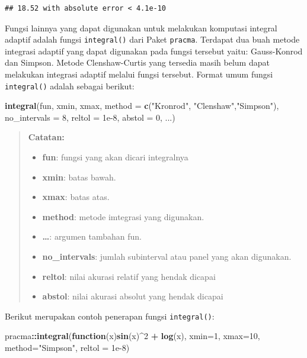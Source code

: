 \documentclass[]{book}
\newenvironment{Shaded}{\begin{snugshade}}{\end{snugshade}}
\newcommand{\ControlFlowTok}[1]{\textcolor[rgb]{0.13,0.29,0.53}{\textbf{#1}}}
\newcommand{\DataTypeTok}[1]{\textcolor[rgb]{0.13,0.29,0.53}{#1}}
\newcommand{\DecValTok}[1]{\textcolor[rgb]{0.00,0.00,0.81}{#1}}
\newcommand{\FloatTok}[1]{\textcolor[rgb]{0.00,0.00,0.81}{#1}}
\newcommand{\KeywordTok}[1]{\textcolor[rgb]{0.13,0.29,0.53}{\textbf{#1}}}
\newcommand{\NormalTok}[1]{#1}
\newcommand{\OperatorTok}[1]{\textcolor[rgb]{0.81,0.36,0.00}{\textbf{#1}}}
\newcommand{\StringTok}[1]{\textcolor[rgb]{0.31,0.60,0.02}{#1}}
\providecommand{\tightlist}{%
  \setlength{\itemsep}{0pt}\setlength{\parskip}{0pt}}
\theoremstyle{definition}
\theoremstyle{definition}
\theoremstyle{definition}
\theoremstyle{remark}
\begin{document}
\begin{verbatim}
## 18.52 with absolute error < 4.1e-10
\end{verbatim}

Fungsi lainnya yang dapat digunakan untuk melakukan komputasi integral adaptif adalah fungsi \texttt{integral()} dari Paket \texttt{pracma}. Terdapat dua buah metode integrasi adaptif yang dapat digunakan pada fungsi tersebut yaitu: Gauss-Konrod dan Simpson. Metode Clenshaw-Curtis yang tersedia masih belum dapat melakukan integrasi adaptif melalui fungsi tersebut. Format umum fungsi \texttt{integral()} adalah sebagai berikut:

\begin{Shaded}
\begin{Highlighting}[]
\KeywordTok{integral}\NormalTok{(fun, xmin, xmax,}
         \DataTypeTok{method =} \KeywordTok{c}\NormalTok{(}\StringTok{"Kronrod"}\NormalTok{, }\StringTok{"Clenshaw"}\NormalTok{,}\StringTok{"Simpson"}\NormalTok{),}
         \DataTypeTok{no_intervals =} \DecValTok{8}\NormalTok{, }\DataTypeTok{reltol =} \FloatTok{1e-8}\NormalTok{, }
         \DataTypeTok{abstol =} \DecValTok{0}\NormalTok{, ...)}
\end{Highlighting}
\end{Shaded}

\begin{quote}
\textbf{Catatan:}

\begin{itemize}
\tightlist
\item
  \textbf{fun}: fungsi yang akan dicari integralnya
\item
  \textbf{xmin}: batas bawah.
\item
  \textbf{xmax}: batas atas.
\item
  \textbf{method}: metode imtegrasi yang digunakan.
\item
  \textbf{\ldots{}}: argumen tambahan fun.
\item
  \textbf{no\_intervals}: jumlah subinterval atau panel yang akan digunakan.
\item
  \textbf{reltol}: nilai akurasi relatif yang hendak dicapai
\item
  \textbf{abstol}: nilai akurasi absolut yang hendak dicapai
\end{itemize}
\end{quote}

Berikut merupakan contoh penerapan fungsi \texttt{integral()}:

\begin{Shaded}
\begin{Highlighting}[]
\NormalTok{pracma}\OperatorTok{::}\KeywordTok{integral}\NormalTok{(}\ControlFlowTok{function}\NormalTok{(x)}\KeywordTok{sin}\NormalTok{(x)}\OperatorTok{^}\DecValTok{2} \OperatorTok{+}\StringTok{ }\KeywordTok{log}\NormalTok{(x),}
          \DataTypeTok{xmin=}\DecValTok{1}\NormalTok{, }\DataTypeTok{xmax=}\DecValTok{10}\NormalTok{, }\DataTypeTok{method=}\StringTok{"Simpson"}\NormalTok{,}
          \DataTypeTok{reltol =} \FloatTok{1e-8}\NormalTok{)}
\end{Highlighting}
\end{Shaded}
\end{document}
